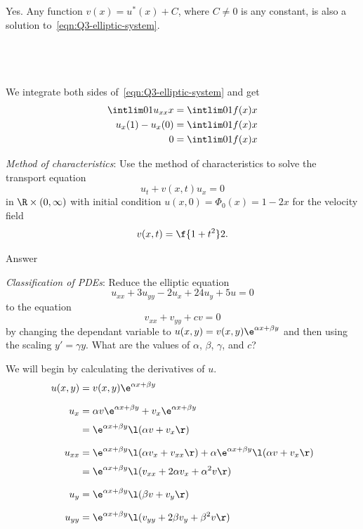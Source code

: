 \documentclass[a4paper]{article}
\begin{document}
Yes. Any function $v(x) = u^*(x) + C$, where $C \ne 0$ is any constant, is also a solution to~\eqref{eqn:Q3-elliptic-system}.

\subsection{~} %

We integrate both sides of~\eqref{eqn:Q3-elliptic-system} and get \begin{align*}
\intlim 01 {u_{xx}} x &= \intlim 01 {f(x)} x \\
u_x(1) - u_x(0) &= \intlim 01 {f(x)} x \\
0 &= \intlim 01 {f(x)} x
\end{align*}



\begin{questionbody}
\textit{Method of characteristics}: Use the method of characteristics to solve the transport equation \[
u_t + v(x, t) u_x = 0
\] in $\R \times (0, \infty)$ with initial condition $u(x, 0) = \Phi_0(x) = 1 - 2x$ for the velocity field \[
v(x, t) = \f{1 + t^2}2.
\]
\end{questionbody}

Answer



\begin{questionbody}
\textit{Classification of PDEs}: Reduce the elliptic equation \[
u_{xx} + 3 u_{yy} - 2 u_x + 24 u_y + 5u = 0
\] to the equation \[
v_{xx} + v_{yy} + cv = 0
\] by changing the dependant variable to $u(x, y) = v(x, y) \e^{\alpha x + \beta y}$ and then using the scaling $y' = \gamma y$. What are the values of $\alpha$, $\beta$, $\gamma$, and $c$?
\end{questionbody}

We will begin by calculating the derivatives of $u$.
\begin{align*}
u(x, y) &= v(x, y) \e^{\alpha x + \beta y} \\[1.5ex]
%
u_x &= \alpha v \e^{\alpha x + \beta y} + v_x \e^{\alpha x + \beta y} \\[0.5ex]
&= \e^{\alpha x + \beta y} \l( \alpha v + v_x \r) \\[1.5ex]
%
u_{xx} &= \e^{\alpha x + \beta y} \l( \alpha v_x + v_{xx} \r) + \alpha \e^{\alpha x + \beta y} \l( \alpha v + v_x \r) \\[0.5ex]
&= \e^{\alpha x + \beta y} \l( v_{xx} + 2\alpha v_x + \alpha^2 v \r) \\[1.5ex]
%
u_y &= \e^{\alpha x + \beta y} \l( \beta v + v_y \r) \\[1.5ex]
%
u_{yy} &= \e^{\alpha x + \beta y} \l( v_{yy} + 2\beta v_y + \beta^2 v \r)
\end{align*}
\end{document}
